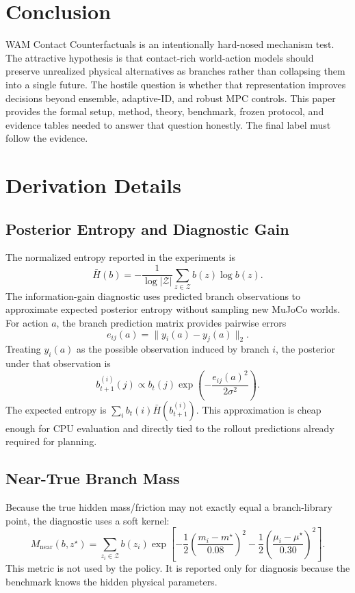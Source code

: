 \documentclass{article}
\newcommand{\latent}{z}
\newcommand{\act}{a}
\newcommand{\branchset}{\mathcal{Z}}
\begin{document}
\section{Conclusion}

WAM Contact Counterfactuals is an intentionally hard-nosed mechanism test.  The attractive hypothesis is that contact-rich world-action models should preserve unrealized physical alternatives as branches rather than collapsing them into a single future.  The hostile question is whether that representation improves decisions beyond ensemble, adaptive-ID, and robust MPC controls.  This paper provides the formal setup, method, theory, benchmark, frozen protocol, and evidence tables needed to answer that question honestly.  The final label must follow the evidence.

\appendix

\section{Derivation Details}

\subsection{Posterior Entropy and Diagnostic Gain}
The normalized entropy reported in the experiments is
\[
  \bar{H}(b)=
  -\frac{1}{\log |\branchset|}
  \sum_{\latent \in \branchset} b(\latent)\log b(\latent).
\]
The information-gain diagnostic uses predicted branch observations to approximate expected posterior entropy without sampling new MuJoCo worlds.  For action $\act$, the branch prediction matrix provides pairwise errors
\[
  e_{ij}(\act)=\|y_i(\act)-y_j(\act)\|_2.
\]
Treating $y_i(\act)$ as the possible observation induced by branch $i$, the posterior under that observation is
\[
  b^{(i)}_{t+1}(j)
  \propto
  b_t(j)\exp\left(-\frac{e_{ij}(\act)^2}{2\sigma^2}\right).
\]
The expected entropy is $\sum_i b_t(i)\bar{H}(b^{(i)}_{t+1})$.  This approximation is cheap enough for CPU evaluation and directly tied to the rollout predictions already required for planning.

\subsection{Near-True Branch Mass}
Because the true hidden mass/friction may not exactly equal a branch-library point, the diagnostic uses a soft kernel:
\[
  M_{\mathrm{near}}(b,z^\star)=
  \sum_{z_i \in \branchset} b(z_i)
  \exp\left[
    -\frac{1}{2}
    \left(
      \frac{m_i-m^\star}{0.08}
    \right)^2
    -\frac{1}{2}
    \left(
      \frac{\mu_i-\mu^\star}{0.30}
    \right)^2
  \right].
\]
This metric is not used by the policy.  It is reported only for diagnosis because the benchmark knows the hidden physical parameters.
\end{document}
